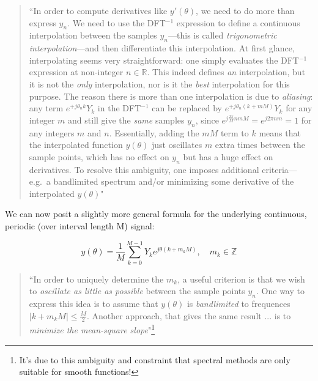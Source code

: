 \documentclass[10pt]{article}
\begin{document}
\begin{quotation}\label{bandlimited}
``In order to compute derivatives like $y'(\theta)$, we need to do more than express $y_n$. We need to use the DFT$^{-1}$ expression to define a continuous interpolation between the samples $y_n$---this is called \textit{trigonometric interpolation}---and then differentiate this interpolation. At first glance, interpolating seems very straightforward: one simply evaluates the DFT$^{-1}$ expression at non-integer $n \in \mathbb{R}$. This indeed defines \textit{an} interpolation, but it is not the \textit{only} interpolation, nor is it the \textit{best} interpolation for this purpose. The reason there is more than one interpolation is due to \textit{aliasing}: any term $e^{+j \theta_n k} Y_k$ in the DFT$^{-1}$ can be replaced by $e^{+j \theta_n (k + mM)} Y_k$ for any integer $m$ and still give the \textit{same} samples $y_n$, since $e^{j \frac{2\pi}{M} nmM} = e^{j2\pi nm} = 1$ for any integers $m$ and $n$. Essentially, adding the $mM$ term to $k$ means that the interpolated function $y(\theta)$ just oscillates $m$ extra times between the sample points, which has no effect on $y_n$ but has a huge effect on derivatives. To resolve this ambiguity, one imposes additional criteria---e.g.~a bandlimited spectrum and/or minimizing some derivative of the interpolated $y(\theta)$"
\end{quotation}

We can now posit a slightly more general formula for the underlying continuous, periodic (over interval length M) signal:\vspace{-2mm}

$$ y(\theta) = \frac{1}{M} \sum_{k=0}^{M-1} Y_k e^{j \theta (k + m_k M)}, \quad m_k \in \mathbb{Z} $$

\begin{quotation}
``In order to uniquely determine the $m_k$, a useful criterion is that we wish to \textit{oscillate as little as possible} between the sample points $y_n$. One way to express this idea is to assume that $y(\theta)$ is \textit{bandlimited} to frequences $|k + m_k M| \leq \frac{M}{2}$. Another approach, that gives the same result ... is to \textit{minimize the mean-square slope}"\footnote{It's due to this ambiguity and constraint that spectral methods are only suitable for smooth functions!}
\end{quotation}\vspace{-7mm}
\end{document}
